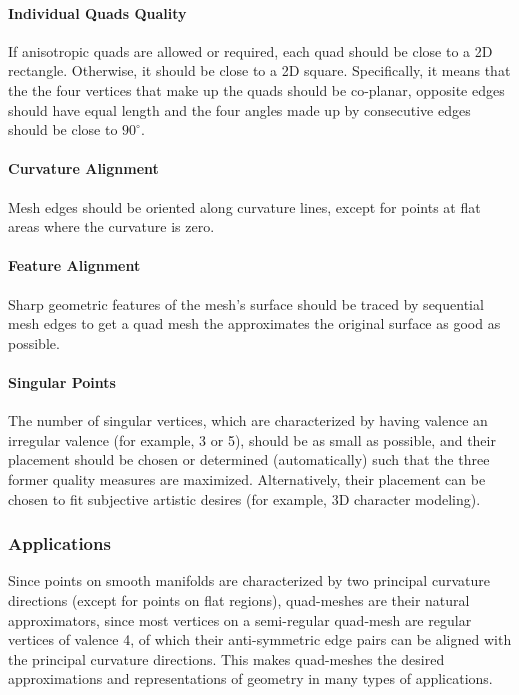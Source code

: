 \paragraph{Individual Quads Quality} If anisotropic quads are allowed or required, each quad should be close to
a 2D rectangle. Otherwise, it should be close to a 2D square. Specifically, it means that the the four vertices that make up the quads should be co-planar, opposite edges should have equal length and the four angles made up by consecutive edges should be close to $90^\circ$.

\paragraph{Curvature Alignment} Mesh edges should be oriented along curvature lines, except for points at flat areas where the curvature is zero.

\paragraph{Feature Alignment} Sharp geometric features of the mesh's surface should be traced by sequential mesh edges to get a quad mesh the approximates the original surface as good as possible.

\paragraph{Singular Points} The number of singular vertices, which are characterized by having valence an irregular valence (for example, 3 or 5), should be as small as possible, and their placement should be chosen or determined (automatically) such that the three former quality measures are maximized. Alternatively, their placement can be chosen to fit subjective artistic desires (for example, 3D character modeling).

\subsubsection{Applications}
Since points on smooth manifolds are characterized by two principal curvature directions (except for points on flat regions), quad-meshes are their natural approximators, since most vertices on a semi-regular quad-mesh are regular vertices of valence 4, of which their anti-symmetric edge pairs can be aligned with the principal curvature directions. This makes quad-meshes the desired approximations and representations of geometry in many types of applications.

